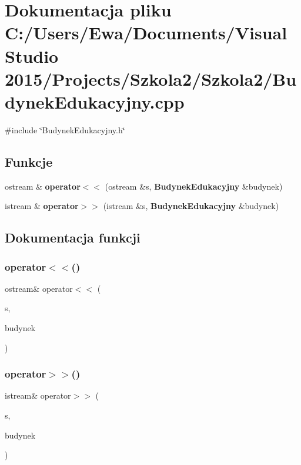 \section{Dokumentacja pliku C\+:/\+Users/\+Ewa/\+Documents/\+Visual Studio 2015/\+Projects/\+Szkola2/\+Szkola2/\+Budynek\+Edukacyjny.cpp}
\label{_budynek_edukacyjny_8cpp}
{\ttfamily \#include \char`\"{}Budynek\+Edukacyjny.\+h\char`\"{}}\newline
\subsection*{Funkcje}
\begin{DoxyCompactItemize}
\item 
ostream \& \textbf{ operator$<$$<$} (ostream \&s, \textbf{ Budynek\+Edukacyjny} \&budynek)
\item 
istream \& \textbf{ operator$>$$>$} (istream \&s, \textbf{ Budynek\+Edukacyjny} \&budynek)
\end{DoxyCompactItemize}


\subsection{Dokumentacja funkcji}
\mbox{\label{_budynek_edukacyjny_8cpp_acb7de1b3048156b676e2bf8d67d5bfaf}} 
\subsubsection{operator$<$$<$()}
{\footnotesize\ttfamily ostream\& operator$<$$<$ (\begin{DoxyParamCaption}\item[{ostream \&}]{s,  }\item[{\textbf{ Budynek\+Edukacyjny} \&}]{budynek }\end{DoxyParamCaption})}

\mbox{\label{_budynek_edukacyjny_8cpp_a710e2d84c1b923f8144743db7abaa75c}} 
\subsubsection{operator$>$$>$()}
{\footnotesize\ttfamily istream\& operator$>$$>$ (\begin{DoxyParamCaption}\item[{istream \&}]{s,  }\item[{\textbf{ Budynek\+Edukacyjny} \&}]{budynek }\end{DoxyParamCaption})}

